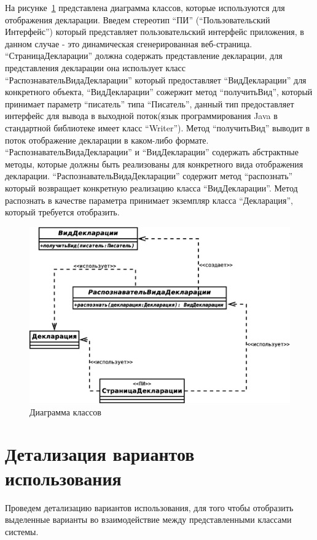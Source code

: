 \documentclass[14pt,a4paper]{reportmod}
\begin{document}
На рисунке~\ref{pic:classes_4} представлена диаграмма классов, которые используются для отображения декларации. Введем стереотип ``ПИ'' (``Пользовательский Интерфейс'') который представляет пользовательский интерфейс приложения, в данном случае - это динамическая сгенерированная веб-страница. ``СтраницаДекларации'' должна содержать представление декларации, для представления декларации она использует класс ``РаспознавательВидаДекларации'' который предоставляет ``ВидДекларации'' для конкретного объекта, ``ВидДекларации'' сожержит метод ``получитьВид'', который принимает параметр ``писатель'' типа ``Писатель'', данный тип предоставляет интерфейс для вывода в выходной поток(язык программирования Java в стандартной библиотеке имеет класс ``Writer''). Метод ``получитьВид'' выводит в поток отображение декларации в каком-либо формате. ``РаспознавательВидаДекларации'' и ``ВидДекларации'' содержать абстрактные методы, которые должны быть реализованы для конкретного вида отображения декларации. ``РаспознавательВидаДекларации'' содержит метод ``распознать'' который возвращает конкретную реализацию класса ``ВидДекларации''. Метод распознать в качестве параметра принимает экземпляр класса ``Декларация'', который требуется отобразить.
\begin{figure}
  \centering
  \includegraphics[scale=0.5]{uml/classes_4}
  \caption{Диаграмма классов}
  \label{pic:classes_4}
\end{figure}
\section{Детализация вариантов использования}
Проведем детализацию вариантов использования, для того чтобы отобразить выделенные варианты во взаимодействие между представленными классами системы.
\end{document}
